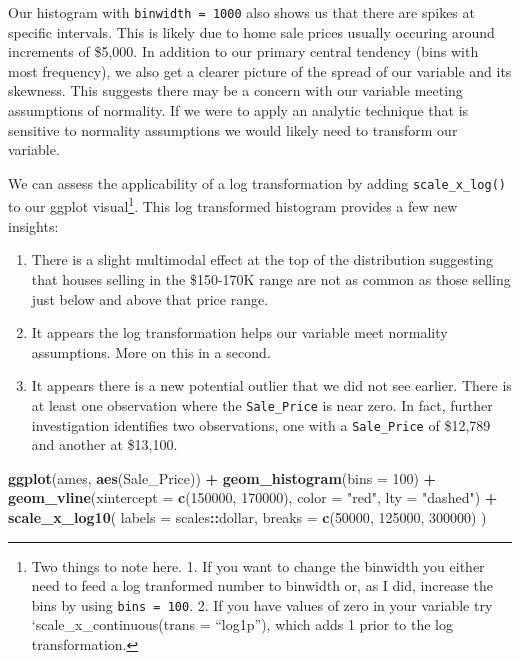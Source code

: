 \documentclass[]{article}
\newenvironment{Shaded}{\begin{snugshade}}{\end{snugshade}}
\newcommand{\KeywordTok}[1]{\textcolor[rgb]{0.13,0.29,0.53}{\textbf{#1}}}
\newcommand{\DataTypeTok}[1]{\textcolor[rgb]{0.13,0.29,0.53}{#1}}
\newcommand{\DecValTok}[1]{\textcolor[rgb]{0.00,0.00,0.81}{#1}}
\newcommand{\StringTok}[1]{\textcolor[rgb]{0.31,0.60,0.02}{#1}}
\newcommand{\OperatorTok}[1]{\textcolor[rgb]{0.81,0.36,0.00}{\textbf{#1}}}
\newcommand{\NormalTok}[1]{#1}
\providecommand{\tightlist}{%
  \setlength{\itemsep}{0pt}\setlength{\parskip}{0pt}}
\let\rmarkdownfootnote\footnote%
\def\footnote{\protect\rmarkdownfootnote}
\begin{document}
Our histogram with \texttt{binwidth\ =\ 1000} also shows us that there
are spikes at specific intervals. This is likely due to home sale prices
usually occuring around increments of \$5,000. In addition to our
primary central tendency (bins with most frequency), we also get a
clearer picture of the spread of our variable and its skewness. This
suggests there may be a concern with our variable meeting assumptions of
normality. If we were to apply an analytic technique that is sensitive
to normality assumptions we would likely need to transform our variable.

We can assess the applicability of a log transformation by adding
\texttt{scale\_x\_log()} to our ggplot visual\footnote{Two things to
  note here. 1. If you want to change the binwidth you either need to
  feed a log tranformed number to binwidth or, as I did, increase the
  bins by using \texttt{bins\ =\ 100}. 2. If you have values of zero in
  your variable try `scale\_x\_continuous(trans = ``log1p''), which adds
  1 prior to the log transformation.}. This log transformed histogram
provides a few new insights:

\begin{enumerate}
\def\labelenumi{\arabic{enumi}.}
\tightlist
\item
  There is a slight multimodal effect at the top of the distribution
  suggesting that houses selling in the \$150-170K range are not as
  common as those selling just below and above that price range.
\item
  It appears the log transformation helps our variable meet normality
  assumptions. More on this in a second.
\item
  It appears there is a new potential outlier that we did not see
  earlier. There is at least one observation where the
  \texttt{Sale\_Price} is near zero. In fact, further investigation
  identifies two observations, one with a \texttt{Sale\_Price} of
  \$12,789 and another at \$13,100.
\end{enumerate}

\begin{Shaded}
\begin{Highlighting}[]
\KeywordTok{ggplot}\NormalTok{(ames, }\KeywordTok{aes}\NormalTok{(Sale_Price)) }\OperatorTok{+}
\StringTok{  }\KeywordTok{geom_histogram}\NormalTok{(}\DataTypeTok{bins =} \DecValTok{100}\NormalTok{) }\OperatorTok{+}
\StringTok{  }\KeywordTok{geom_vline}\NormalTok{(}\DataTypeTok{xintercept =} \KeywordTok{c}\NormalTok{(}\DecValTok{150000}\NormalTok{, }\DecValTok{170000}\NormalTok{), }\DataTypeTok{color =} \StringTok{"red"}\NormalTok{, }\DataTypeTok{lty =} \StringTok{"dashed"}\NormalTok{) }\OperatorTok{+}
\StringTok{  }\KeywordTok{scale_x_log10}\NormalTok{(}
    \DataTypeTok{labels =}\NormalTok{ scales}\OperatorTok{::}\NormalTok{dollar, }
    \DataTypeTok{breaks =} \KeywordTok{c}\NormalTok{(}\DecValTok{50000}\NormalTok{, }\DecValTok{125000}\NormalTok{, }\DecValTok{300000}\NormalTok{)}
\NormalTok{    )}
\end{Highlighting}
\end{Shaded}
\end{document}
